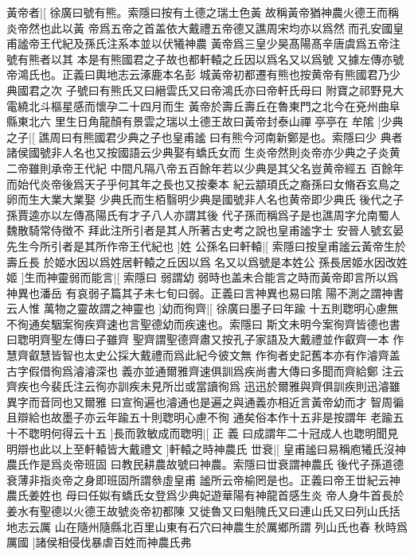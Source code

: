 黃帝者|[%
徐廣曰號有熊。索隱曰按有土德之瑞土色黃%
故稱黃帝猶神農火德王而稱炎帝然也此以黃%
%
帝爲五帝之首盖依大戴禮五帝德又譙周宋均亦以爲然%
而孔安國皇甫謐帝王代紀及孫氏注系本並以伏犧神農%
%
黃帝爲三皇少昊髙陽髙辛唐虞爲五帝注號有熊者以其%
本是有熊國君之子故也都軒轅之丘因以爲名又以爲號%
%
又據左傳亦號帝鴻氏也。正義曰輿地志云涿鹿本名彭%
城黃帝初都遷有熊也按黄帝有熊國君乃少典國君之次%
%
子號曰有熊氏又曰縉雲氏又曰帝鴻氏亦曰帝軒氏母曰%
附寶之祁野見大電繞北斗樞星感而懷孕二十四月而生%
%
黃帝於壽丘壽丘在魯東門之北今在兗州曲阜縣東北六%
里生日角龍顏有景雲之瑞以土德王故曰黃帝封泰山禪%
%
亭亭在%
牟隂%
]少典之子|[%
譙周曰有熊國君少典之子也皇甫謐%
曰有熊今河南新鄭是也。索隱曰少%
%
典者諸侯國號非人名也又按國語云少典娶有蟜氏女而%
生炎帝然則炎帝亦少典之子炎黄二帝雖則承帝王代紀%
%
中間凡隔八帝五百餘年若以少典是其父名豈黄帝經五%
百餘年而始代炎帝後爲天子乎何其年之長也又按秦本%
%
紀云顓頊氏之裔孫曰女脩吞玄鳥之卵而生大業大業娶%
少典氏而生栢翳明少典是國號非人名也黄帝即少典氏%
%
後代之子孫賈逵亦以左傳髙陽氏有才子八人亦謂其後%
代子孫而稱爲子是也譙周字允南蜀人魏散騎常侍徴不%
%
拜此注所引者是其人所著古史考之說也皇甫謐字士%
安晉人號玄晏先生今所引者是其所作帝王代紀也%
]姓%
%
公孫名曰軒轅|[%
索隱曰按皇甫謐云黃帝生於壽丘長%
於姬水因以爲姓居軒轅之丘因以爲%
%
名又以爲號是本姓公%
孫長居姬水因改姓姬%
]生而神靈弱而能言|[%
索隱曰%
弱謂幼%
%
弱時也盖未合能言之時而黃帝即言所以爲神異也潘岳%
有哀弱子篇其子未七旬曰弱。正義曰言神異也易曰隂%
%
陽不測之謂神書云人惟%
萬物之靈故謂之神靈也%
]幼而徇齊|[%
徐廣曰墨子曰年踰%
十五則聦明心慮無%
%
不徇通矣駰案徇疾齊速也言聖德幼而疾速也。索隱曰%
斯文未明今案徇齊皆德也書曰聦明齊聖左傳曰子雖齊%
%
聖齊謂聖德齊肅又按孔子家語及大戴禮並作叡齊一本%
作慧齊叡慧皆智也太史公採大戴禮而爲此紀今彼文無%
%
作徇者史記舊本亦有作濬齊盖古字假借徇爲濬濬深也%
義亦並通爾雅齊速俱訓爲疾尚書大傳曰多聞而齊給鄭%
%
注云齊疾也今裴氏注云徇亦訓疾未見所岀或當讀徇爲%
迅迅於爾雅與齊俱訓疾則迅濬雖異字而音同也又爾雅%
%
曰宣徇遍也濬通也是遍之與通義亦相近言黃帝幼而才%
智周徧且辯給也故墨子亦云年踰五十則聦明心慮不徇%
%
通矣俗本作十五非是按謂年%
老踰五十不聦明何得云十五%
]長而敦敏成而聦明|[%
正%
義%
%
曰成謂年二十冠成人也聦明聞見%
明辯也此以上至軒轅皆大戴禮文%
]軒轅之時神農氏%
%
丗衰|[%
皇甫謐曰易稱庖犧氏沒神農氏作是爲炎帝班固%
曰教民耕農故號曰神農。索隱曰丗衰謂神農氏%
%
後代子孫道德衰薄非指炎帝之身即班固所謂叅虛皇甫%
謐所云帝榆罔是也。正義曰帝王丗紀云神農氏姜姓也%
%
母曰任姒有蟜氏女登爲少典妃遊華陽有神龍首感生炎%
帝人身牛首長於姜水有聖德以火德王故號炎帝初都陳%
%
又徙魯又曰魁隗氏又曰連山氏又曰列山氏括地志云厲%
山在隨州隨縣北百里山東有石穴曰神農生於厲鄉所謂%
%
列山氏也春%
秋時爲厲國%
]諸侯相侵伐暴虐百姓而神農氏弗%
